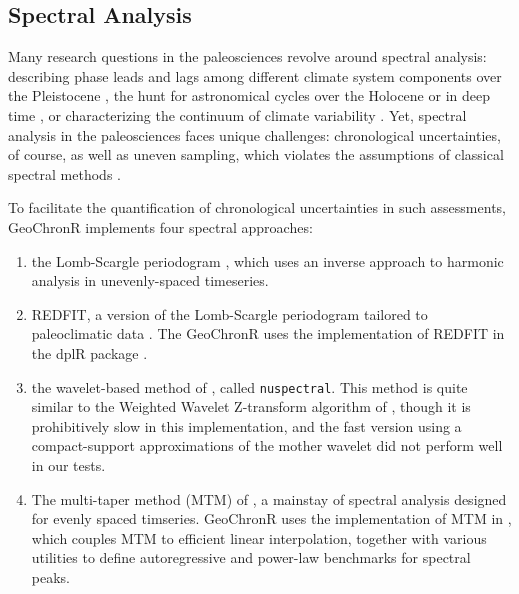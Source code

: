 \documentclass[gchron, manuscript]{copernicus}
\begin{document}
\hypertarget{sec:spec_theory}{%
\subsection{Spectral Analysis}\label{sec:spec_theory}}

Many research questions in the paleosciences revolve around spectral analysis: describing phase leads and lags among different climate system components over the Pleistocene \citep[SPECMAP,][]{imbrie1984orbital}, the hunt for astronomical cycles over the Holocene \citep[\citet{bond2001}]{mill_monograph} or in deep time \citep[\citet{Meyers_2012},\citet{Meyers_2015}]{MeyersSageman_2007}, or characterizing the continuum of climate variability \citep[\citet{ZhuPNAS2019}]{Huybers_Curry2006}.
Yet, spectral analysis in the paleosciences faces unique challenges: chronological uncertainties, of course, as well as uneven sampling, which violates the assumptions of classical spectral methods \citep{Ghil02}.

To facilitate the quantification of chronological uncertainties in such assessments, GeoChronR implements four spectral approaches:

\begin{enumerate}
\def\labelenumi{\arabic{enumi}.}
\item
  the Lomb-Scargle periodogram \citep{VanderPlas_2018}, which uses an inverse approach to harmonic analysis in unevenly-spaced timeseries.
\item
  REDFIT, a version of the Lomb-Scargle periodogram tailored to paleoclimatic data \citep[\citet{Mudelsee_02}, \citet{Mudelsee_NPG09}]{SchulzMudelsee_02}.
  The GeoChronR uses the implementation of REDFIT in the dplR package \citep{Bunn2008115}.
\item
  the wavelet-based method of \citet{Mathias_JSS04}, called \texttt{nuspectral}. This method is quite similar to the Weighted Wavelet Z-transform algorithm of \citet{Foster_AJ96}, though it is prohibitively slow in this implementation, and the fast version using a compact-support approximations of the mother wavelet did not perform well in our tests.
\item
  The multi-taper method (MTM) of \citet{thomson82}, a mainstay of spectral analysis \citep{Ghil02} designed for evenly spaced timseries. GeoChronR uses the implementation of MTM in \citet{astrochron}, which couples MTM to efficient linear interpolation, together with various utilities to define autoregressive and power-law benchmarks for spectral peaks.
\end{enumerate}
\end{document}
